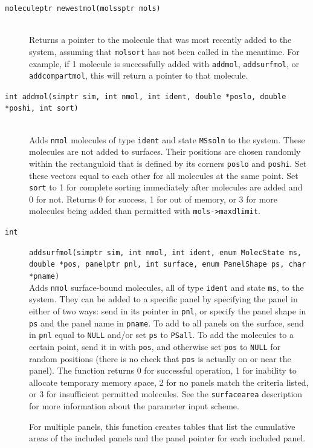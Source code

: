 \documentclass {scrbook}
\newcommand {\ttt} {\texttt}
\begin{document}
\begin{description}
\item[\ttt{moleculeptr newestmol(molssptr mols)}]
\hfill \\
Returns a pointer to the molecule that was most recently added to the system, assuming that \ttt{molsort} has not been called in the meantime. For example, if 1 molecule is successfully added with \ttt{addmol}, \ttt{addsurfmol}, or \ttt{addcompartmol}, this will return a pointer to that molecule.

\item[\ttt{int addmol(simptr sim, int nmol, int ident, double *poslo, double *poshi, int sort)}]
\hfill \\
Adds \ttt{nmol} molecules of type \ttt{ident} and state \ttt{MSsoln} to the system. These molecules are not added to surfaces. Their positions are chosen randomly within the rectanguloid that is defined by its corners \ttt{poslo} and \ttt{poshi}. Set these vectors equal to each other for all molecules at the same point. Set \ttt{sort} to 1 for complete sorting immediately after molecules are added and 0 for not. Returns 0 for success, 1 for out of memory, or 3 for more molecules being added than permitted with \ttt{mols->maxdlimit}.

\item[\ttt{int}]
\ttt{addsurfmol(simptr sim, int nmol, int ident, enum MolecState ms, double *pos, panelptr pnl, int surface, enum PanelShape ps, char *pname)} \\
Adds \ttt{nmol} surface-bound molecules, all of type \ttt{ident} and state \ttt{ms}, to the system. They can be added to a specific panel by specifying the panel in either of two ways: send in its pointer in \ttt{pnl}, or specify the panel shape in \ttt{ps} and the panel name in \ttt{pname}. To add to all panels on the surface, send in \ttt{pnl} equal to \ttt{NULL} and/or set \ttt{ps} to \ttt{PSall}. To add the molecules to a certain point, send it in with \ttt{pos}, and otherwise set \ttt{pos} to \ttt{NULL} for random positions (there is no check that \ttt{pos} is actually on or near the panel). The function returns 0 for successful operation, 1 for inability to allocate temporary memory space, 2 for no panels match the criteria listed, or 3 for insufficient permitted molecules. See the \ttt{surfacearea} description for more information about the parameter input scheme.

For multiple panels, this function creates tables that list the cumulative areas of the included panels and the panel pointer for each included panel.


\end{description}
\end{document}
